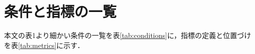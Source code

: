 \section{条件と指標の一覧}\label{sup:design}
本文の表1より細かい条件の一覧を表\ref{tab:conditions}に，指標の定義と位置づけを表\ref{tab:metrics}に示す．

\begin{table}[tbp]
  \centering
  \small
  \caption{条件の一覧}
  \label{tab:conditions}
  
\end{table}

\begin{table}[p]
  \centering
  \small
  \caption{指標の定義と位置づけ}
  \label{tab:metrics}
  
\end{table}
